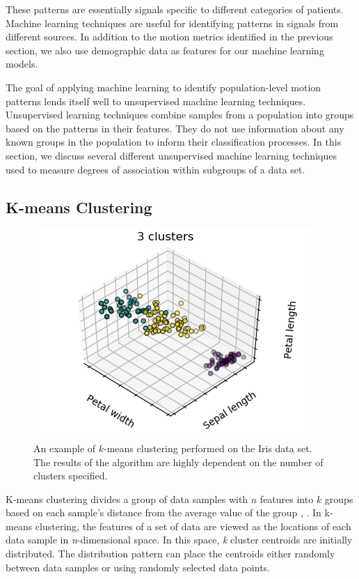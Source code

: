 These patterns are essentially signals specific to different categories of patients. Machine learning techniques are useful for identifying patterns in signals from different sources. In addition to the motion metrics identified in the previous section, we also use demographic data as features for our machine learning models. 

The goal of applying machine learning to identify population-level motion patterns lends itself well to unsupervised machine learning techniques. Unsupervised learning techniques combine samples from a population into groups based on the patterns in their features. They do not use information about any known groups in the population to inform their classification processes. In this section, we discuss several different unsupervised machine learning techniques used to measure degrees of association within subgroups of a data set.

\subsection{K-means Clustering}

\begin{figure}
\centering
\includegraphics[width=.5\textwidth]{4/kmeans-example.png}
\caption{An example of $k$-means clustering performed on the Iris data set. The results of the algorithm are highly dependent on the number of clusters specified.}
\label{ch4:fig:kmeans}
\end{figure}

K-means clustering divides a group of data samples with $n$ features into $k$ groups based on each sample's distance from the average value of the group \cite{Hartigan1979}, \cite{macqueen1967}. In k-means clustering, the features of a set of data are viewed as the locations of each data sample in \textit{n}-dimensional space. In this space, \textit{k} cluster centroids are initially distributed. The distribution pattern can place the centroids either randomly between data samples or using randomly selected data points.

